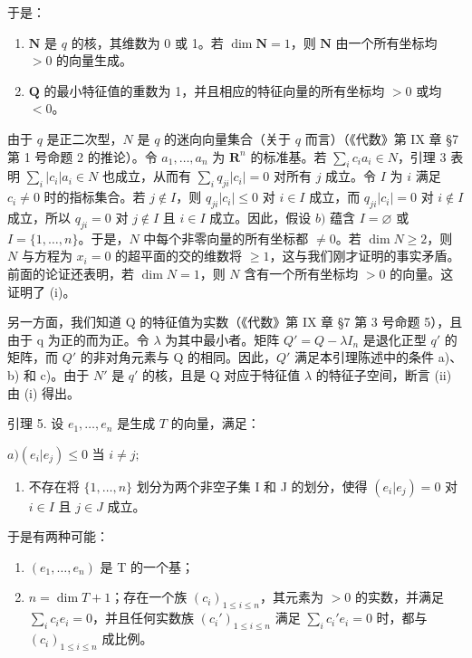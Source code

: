 于是：

\begin{enumerate}
\def\labelenumi{(\roman{enumi})}
\item
\(\mathbf{N}\) 是 \(q\) 的核，其维数为 0 或 1。若 \(\dim \mathbf{N} = 1\)，则 \(\mathbf{N}\) 由一个所有坐标均 \(> 0\) 的向量生成。
\item
\(\mathbf{Q}\) 的最小特征值的重数为 1，并且相应的特征向量的所有坐标均 \(>0\) 或均 \(< 0\)。
\end{enumerate}

由于 \(q\) 是正二次型，\(N\) 是 \(q\) 的迷向向量集合（关于 \(q\) 而言）（《代数》第 IX 章 §7 第 1 号命题 2 的推论）。令 \(a_1, \ldots, a_n\) 为 \(\mathbf{R}^n\) 的标准基。若 \(\sum_{i} c_i a_i \in N\)，引理 3 表明 \(\sum_{i} |c_i| a_i \in N\) 也成立，从而有 \(\sum_{i} q_{ji}|c_i| = 0\) 对所有 \(j\) 成立。令 \(I\) 为 \(i\) 满足 \(c_i \neq 0\) 时的指标集合。若 \(j \notin I\)，则 \(q_{ji}|c_i| \leqslant 0\) 对 \(i \in I\) 成立，而 \(q_{ji}|c_i| = 0\) 对 \(i \notin I\) 成立，所以 \(q_{ji} = 0\) 对 \(j \notin I\) 且 \(i \in I\) 成立。因此，假设 \(b)\) 蕴含 \(I = \varnothing\) 或 \(I = \{1, \ldots, n\}\)。于是，\(N\) 中每个非零向量的所有坐标都 \(\neq 0\)。若 \(\dim N \geqslant 2\)，则 \(N\) 与方程为 \(x_i = 0\) 的超平面的交的维数将 \(\geqslant 1\)，这与我们刚才证明的事实矛盾。前面的论证还表明，若 \(\dim N = 1\)，则 \(N\) 含有一个所有坐标均 \(>0\) 的向量。这证明了 (i)。

另一方面，我们知道 Q 的特征值为实数（《代数》第 IX 章 §7 第 3 号命题 5），且由于 q 为正的而为正。令 \(\lambda\) 为其中最小者。矩阵 \(Q' = Q - \lambda I_n\) 是退化正型 \(q'\) 的矩阵，而 \(Q'\) 的非对角元素与 Q 的相同。因此，\(Q'\) 满足本引理陈述中的条件 a)、b) 和 c)。由于 \(N'\) 是 \(q'\) 的核，且是 Q 对应于特征值 \(\lambda\) 的特征子空间，断言 (ii) 由 (i) 得出。

引理 5. 设 \(e_1, \ldots, e_n\) 是生成 \(T\) 的向量，满足：

\(a) (e_i | e_j) \leqslant 0 \text{ 当 } i \neq j;\)

\begin{enumerate}
\def\labelenumi{\alph{enumi})}
\setcounter{enumi}{1}
\tightlist
\item
不存在将 \(\{1, \ldots, n\}\) 划分为两个非空子集 I 和 J 的划分，使得 \((e_i|e_j) = 0\) 对 \(i \in I\) 且 \(j \in J\) 成立。
\end{enumerate}

于是有两种可能：

\begin{enumerate}
\def\labelenumi{\arabic{enumi})}
\item
\((e_1, \ldots, e_n)\) 是 T 的一个基；
\item
\(n = \dim T + 1\)；存在一个族 \((c_i)_{1 \leqslant i \leqslant n}\)，其元素为 \(> 0\) 的实数，并满足 \(\sum_{i} c_i e_i = 0\)，并且任何实数族 \((c_i')_{1 \leqslant i \leqslant n}\) 满足 \(\sum_{i} c_i' e_i = 0\) 时，都与 \((c_i)_{1 \leqslant i \leqslant n}\) 成比例。
\end{enumerate}

